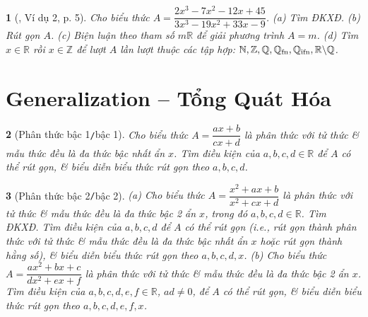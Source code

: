 \documentclass{article}
\newtheorem{baitoan}{}
\begin{document}
\begin{baitoan}[\cite{Lam_An_Tuan_Toan_9_dai_so}, Ví dụ 2, p. 5]
	Cho biểu thức $A = \dfrac{2x^3 - 7x^2 - 12x + 45}{3x^3 -19x^2 + 33x - 9}$. (a) Tìm {\rm ĐKXĐ}. (b) Rút gọn $A$. (c) Biện luận theo tham số $m\mathbb{R}$ để giải phương trình $A = m$. (d) Tìm $x\in\mathbb{R}$ rồi $x\in\mathbb{Z}$ để lượt $A$ lần lượt thuộc các tập hợp:  $\mathbb{N},\mathbb{Z},\mathbb{Q},\mathbb{Q}_{\rm fn},\mathbb{Q}_{\rm ifn},\mathbb{R}\backslash\mathbb{Q}$.
\end{baitoan}

\section{Generalization -- Tổng Quát Hóa}

\begin{baitoan}[Phân thức bậc 1{\tt/}bậc 1]
	Cho biểu thức $A = \dfrac{ax + b}{cx + d}$ là phân thức với tử thức \& mẫu thức đều là đa thức bậc nhất ẩn $x$. Tìm điều kiện của $a,b,c,d\in\mathbb{R}$ để $A$ có thể rút gọn, \& biểu diễn biểu thức rút gọn theo $a,b,c,d$.
\end{baitoan}

\begin{baitoan}[Phân thức bậc 2{\tt/}bậc 2]
	(a) Cho biểu thức $A = \dfrac{x^2 + ax + b}{x^2 + cx + d}$ là phân thức với tử thức \& mẫu thức đều là đa thức bậc 2 ẩn $x$, trong đó $a,b,c,d\in\mathbb{R}$. Tìm {\rm ĐKXĐ}. Tìm điều kiện của $a,b,c,d$ để $A$ có thể rút gọn (i.e., rút gọn thành phân thức với tử thức \& mẫu thức đều là đa thức bậc nhất ẩn $x$ hoặc rút gọn thành hằng số), \& biểu diễn biểu thức rút gọn theo $a,b,c,d,x$. (b) Cho biểu thức $A = \dfrac{ax^2 + bx + c}{dx^2 + ex + f}$ là phân thức với tử thức \& mẫu thức đều là đa thức bậc 2 ẩn $x$. Tìm điều kiện của $a,b,c,d,e,f\in\mathbb{R}$, $ad\ne0$, để $A$ có thể rút gọn, \& biểu diễn biểu thức rút gọn theo $a,b,c,d,e,f,x$.
\end{baitoan}


\printbibliography[heading=bibintoc]
\end{document}
